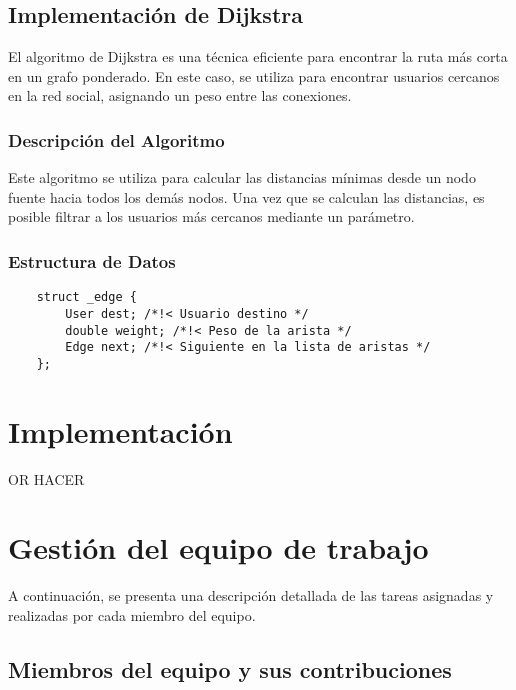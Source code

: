 \documentclass[9pt,letterpaper,onecolumn]{rho-class/rho}
\begin{document}
    \subsection{Implementación de Dijkstra}
    El algoritmo de Dijkstra es una técnica eficiente para encontrar la ruta más corta en un grafo ponderado.
    En este caso, se utiliza para encontrar usuarios cercanos en la red social, asignando un peso entre las conexiones. 

    \subsubsection{Descripción del Algoritmo}
    Este algoritmo se utiliza para calcular las distancias mínimas desde un nodo fuente hacia todos los demás nodos. 
    Una vez que se calculan las distancias, es posible filtrar a los usuarios más cercanos mediante un parámetro.

    \subsubsection{Estructura de Datos}
    \begin{verbatim}
    struct _edge {
        User dest; /*!< Usuario destino */
        double weight; /*!< Peso de la arista */
        Edge next; /*!< Siguiente en la lista de aristas */
    };
    \end{verbatim}


\section{Implementación}

    OR HACER

\section{Gestión del equipo de trabajo}

    A continuación, se presenta una descripción detallada de las tareas asignadas y realizadas por cada miembro del equipo.
    
    \subsection{Miembros del equipo y sus contribuciones}
    
\end{document}
